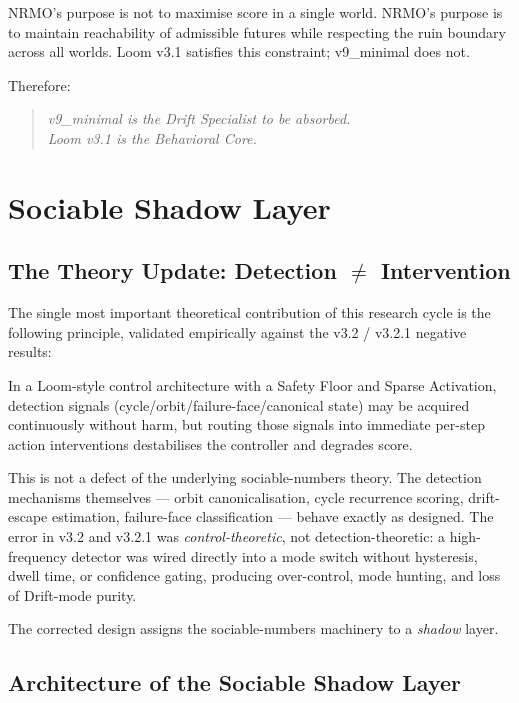 NRMO's purpose is not to maximise score in a single world. NRMO's
purpose is to maintain reachability of admissible futures while
respecting the ruin boundary across all worlds. Loom v3.1 satisfies
this constraint; v9\_minimal does not.

Therefore:

\begin{quote}
\emph{v9\_minimal is the Drift Specialist to be absorbed.\\
Loom v3.1 is the Behavioral Core.}
\end{quote}

\chapter{Sociable Shadow Layer}
\label{ch:sociable_shadow}

\section{The Theory Update: Detection $\neq$ Intervention}

The single most important theoretical contribution of this
research cycle is the following principle, validated empirically
against the v3.2 / v3.2.1 negative results:

\begin{theorem}
\label{thm:detection_neq_intervention}
In a Loom-style control architecture with a Safety Floor and Sparse
Activation, detection signals (cycle/orbit/failure-face/canonical
state) may be acquired continuously without harm, but routing those
signals into immediate per-step action interventions destabilises
the controller and degrades score.
\end{theorem}

This is not a defect of the underlying sociable-numbers theory. The
detection mechanisms themselves --- orbit canonicalisation, cycle
recurrence scoring, drift-escape estimation, failure-face
classification --- behave exactly as designed. The error in v3.2 and
v3.2.1 was \emph{control-theoretic}, not detection-theoretic: a
high-frequency detector was wired directly into a mode switch
without hysteresis, dwell time, or confidence gating, producing
over-control, mode hunting, and loss of Drift-mode purity.

The corrected design assigns the sociable-numbers machinery to a
\emph{shadow} layer.

\section{Architecture of the Sociable Shadow Layer}

